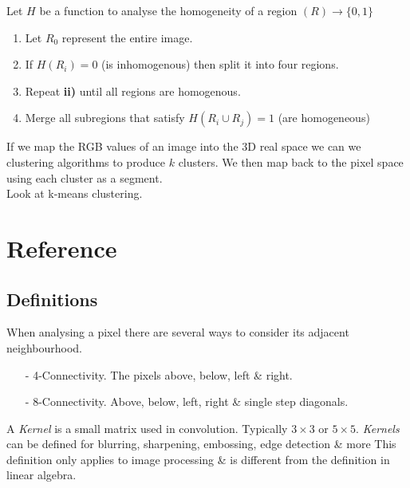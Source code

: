 \documentclass[11pt,a4paper]{article}
\begin{document}
Let $H$ be a function to analyse the homogeneity of a region $(R)\to\{0,1\}$
\begin{enumerate}[label=\roman*)]
	\item Let $R_0$ represent the entire image.
	\item If $H(R_i)=0$ (\ie is inhomogenous) then split it into four regions.
	\item Repeat \textbf{ii)} until all regions are homogenous.
	\item Merge all subregions that satisfy $H(R_i\cup R_j)=1$ (\ie are homogeneous)
\end{enumerate}

If we map the RGB values of an image into the 3D real space we can we clustering algorithms to produce $k$ clusters. We then map back to the pixel space using each cluster as a segment.\\
\nb Look at k-means clustering.

\newpage
\setcounter{section}{-1}

\section{Reference}

\subsection{Definitions}

When analysing a pixel there are several ways to consider its adjacent neighbourhood.
\begin{itemize}
	\item[-] 4-Connectivity. The pixels above, below, left \& right.
	\item[-] 8-Connectivity. Above, below, left, right \& single step diagonals.
\end{itemize}

A \textit{Kernel} is a small matrix used in convolution. Typically $3\times3$ or $5\times5$. \textit{Kernels} can be defined for blurring, sharpening, embossing, edge detection \& more
\nb This definition only applies to image processing \& is different from the definition in linear algebra.
\end{document}
